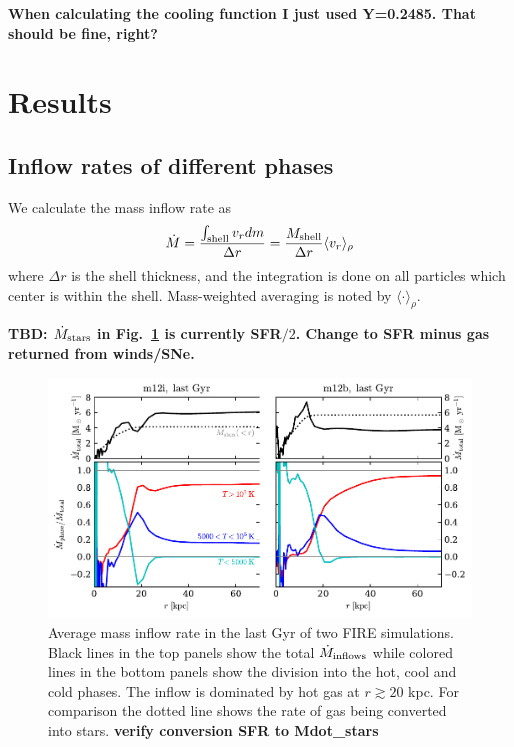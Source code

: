 \documentclass[fleqn,usenatbib]{mnras}
\newcommand{\Mdot}{\dot{M}}
\newcommand{\Rvir}{R_{\rm vir}}
\begin{document}
\textbf{When calculating the cooling function I just used Y=0.2485. That should be fine, right?}

\section{Results}
\subsection{Inflow rates of different phases}
\newcommand{\nH}{n_{\rm H}}

We calculate the mass inflow rate as
\begin{equation}\label{e:Mdot}
     \Mdot = \frac{\int_{\rm shell} v_r dm}{\Delta r} = \frac{M_{\rm shell}}{\Delta r} \langle v_r\rangle_\rho
\end{equation}
where $\Delta r$ is the shell thickness, and the integration is done on all particles which center is within the shell. Mass-weighted averaging is noted by $\langle\cdot\rangle_\rho$.

\textbf{TBD: $\dot{M}_{\rm stars}$ in Fig.~\ref{f:Mdot} is currently SFR$/2$. Change to SFR minus gas returned from winds/SNe.}
    
\begin{figure}
    \centering
    \includegraphics{Mdot_normalized.pdf}
    \caption{
    Average mass inflow rate in the last Gyr of two FIRE simulations. Black lines in the top panels show the total $\dot{M}_{\rm inflows}$  while colored lines in the bottom panels show the division into the hot, cool and cold phases. 
    The inflow is dominated by hot gas at $r\gtrsim 20 $ kpc. For comparison the dotted line shows the rate of gas being converted into stars.
    \textbf{verify conversion SFR to Mdot\_stars}
    }
    \label{f:Mdot}
\end{figure}
\end{document}

